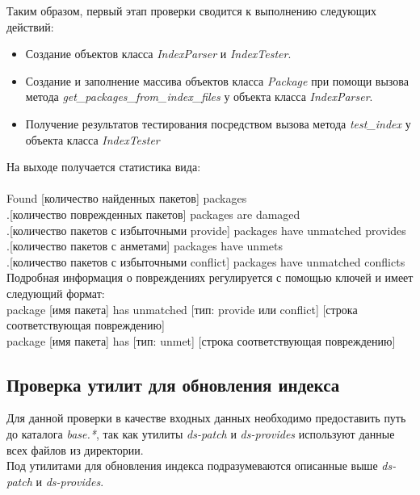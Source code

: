Таким образом, первый этап проверки сводится к выполнению следующих действий:
\begin{itemize}
\item{Создание объектов класса \textit{IndexParser} и \textit{IndexTester}.}
\item{Создание и заполнение массива объектов класса \textit{Package} при помощи
вызова метода \textit{get\_packages\_from\_index\_files} у объекта класса \textit{IndexParser}.}
\item{Получение результатов тестирования посредством вызова метода \textit{test\_index}
у объекта класса \textit{IndexTester}}
\end{itemize}

На выходе получается статистика вида:\\
\\
Found [количество найденных пакетов] packages\\
.[количество поврежденных пакетов] packages are damaged\\
.[количество пакетов с избыточными provide] packages have unmatched provides\\
.[количество пакетов с анметами] packages have unmets\\
.[количество пакетов с избыточными conflict] packages have unmatched conflicts\\

Подробная информация о повреждениях регулируется с помощью ключей и имеет следующий формат:\\
package [имя пакета] has unmatched [тип: provide или conflict] [строка соответствующая повреждению]\\
package [имя пакета] has [тип: unmet] [строка соответствующая повреждению]\\

\subsection{Проверка утилит для обновления индекса}
Для данной проверки в качестве входных данных необходимо предоставить
путь до каталога \textit{base.*}, так как утилиты \textit{ds-patch} и 
\textit{ds-provides} используют данные всех файлов из директории.\\
Под утилитами для обновления индекса подразумеваются описанные
выше \textit{ds-patch} и \textit{ds-provides}.

